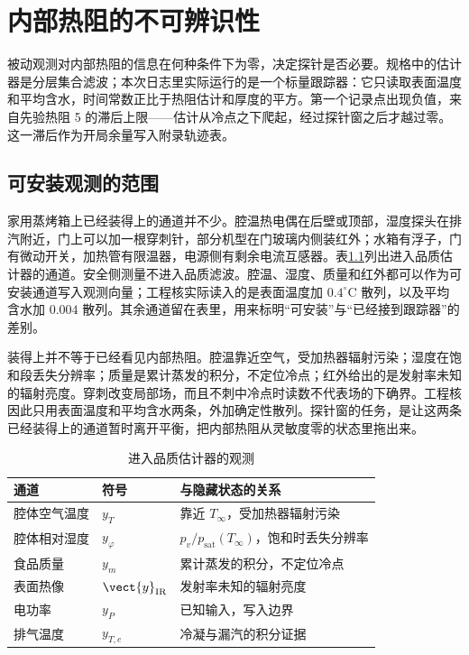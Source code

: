 \chapter{内部热阻的不可辨识性}
\label{ch:est}

被动观测对内部热阻的信息在何种条件下为零，决定探针是否必要。规格中的估计器是分层集合滤波；本次日志里实际运行的是一个标量跟踪器：它只读取表面温度和平均含水，时间常数正比于热阻估计和厚度的平方。第一个记录点出现负值，来自先验热阻 5 的滞后上限——估计从冷点之下爬起，经过探针窗之后才越过零。这一滞后作为开局余量写入附录轨迹表。

\section{可安装观测的范围}

家用蒸烤箱上已经装得上的通道并不少。腔温热电偶在后壁或顶部，湿度探头在排汽附近，门上可以加一根穿刺针，部分机型在门玻璃内侧装红外；水箱有浮子，门有微动开关，加热管有限温器，电源侧有剩余电流互感器。表\ref{tab:obs}列出进入品质估计器的通道。安全侧测量不进入品质滤波。腔温、湿度、质量和红外都可以作为可安装通道写入观测向量；工程核实际读入的是表面温度加 \(0.4^\circ\mathrm{C}\) 散列，以及平均含水加 \(0.004\) 散列。其余通道留在表里，用来标明“可安装”与“已经接到跟踪器”的差别。

装得上并不等于已经看见内部热阻。腔温靠近空气，受加热器辐射污染；湿度在饱和段丢失分辨率；质量是累计蒸发的积分，不定位冷点；红外给出的是发射率未知的辐射亮度。穿刺改变局部场，而且不刺中冷点时读数不代表场的下确界。工程核因此只用表面温度和平均含水两条，外加确定性散列。探针窗的任务，是让这两条已经装得上的通道暂时离开平衡，把内部热阻从灵敏度零的状态里拖出来。

\begin{table}[htbp]
\centering
\caption{进入品质估计器的观测}
\label{tab:obs}
\begin{tabularx}{\textwidth}{llX}
\toprule
通道 & 符号 & 与隐藏状态的关系 \\
\midrule
腔体空气温度 & \(y_T\) & 靠近 \(T_\infty\)，受加热器辐射污染 \\
腔体相对湿度 & \(y_\varphi\) & \(p_v/p_{\mathrm{sat}}(T_\infty)\)，饱和时丢失分辨率 \\
食品质量 & \(y_m\) & 累计蒸发的积分，不定位冷点 \\
表面热像 & \(\vect{y}_{\mathrm{IR}}\) & 发射率未知的辐射亮度 \\
电功率 & \(y_P\) & 已知输入，写入边界 \\
排气温度 & \(y_{T,e}\) & 冷凝与漏汽的积分证据 \\
\bottomrule
\end{tabularx}
\end{table}


